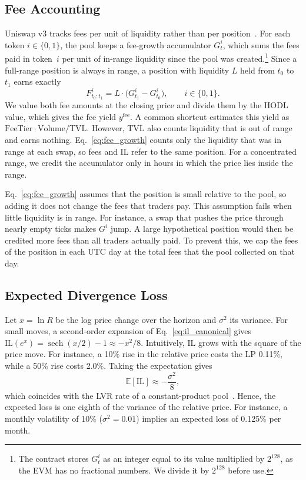 \documentclass[10pt,conference,compsocconf]{IEEEtran}
\begin{document}
\subsection{Fee Accounting}
\label{subsec:fee_accounting}
Uniswap v3 tracks fees per unit of liquidity rather than per position~\cite{uniswapv3}. For each token $i\in\{0,1\}$, the pool keeps a fee-growth accumulator $G^{i}_t$, which sums the fees paid in token~$i$ per unit of in-range liquidity since the pool was created.\footnote{The contract stores $G^{i}_t$ as an integer equal to its value multiplied by $2^{128}$, as the EVM has no fractional numbers. We divide it by $2^{128}$ before use.} Since a full-range position is always in range, a position with liquidity $L$ held from $t_0$ to $t_1$ earns exactly
\begin{equation}
\label{eq:fee_growth}
F^{i}_{t_0:t_1} = L\cdot\bigl(G^{i}_{t_1}-G^{i}_{t_0}\bigr), \qquad i\in\{0,1\}.
\end{equation}
We value both fee amounts at the closing price and divide them by the HODL value, which gives the fee yield $y^{\mathrm{fee}}$. A common shortcut estimates this yield as $\mathrm{FeeTier}\cdot\mathrm{Volume}/\mathrm{TVL}$. However, TVL also counts liquidity that is out of range and earns nothing. Eq.~\eqref{eq:fee_growth} counts only the liquidity that was in range at each swap, so fees and IL refer to the same position. For a concentrated range, we credit the accumulator only in hours in which the price lies inside the range.

Eq.~\eqref{eq:fee_growth} assumes that the position is small relative to the pool, so adding it does not change the fees that traders pay. This assumption fails when little liquidity is in range. For instance, a swap that pushes the price through nearly empty ticks makes $G^{i}$ jump. A large hypothetical position would then be credited more fees than all traders actually paid. To prevent this, we cap the fees of the position in each UTC day at the total fees that the pool collected on that day.

\subsection{Expected Divergence Loss}
\label{subsec:lvr}
Let $x=\ln R$ be the log price change over the horizon and $\sigma^2$ its variance. For small moves, a second-order expansion of Eq.~\eqref{eq:il_canonical} gives $\mathrm{IL}(e^{x}) = \operatorname{sech}(x/2)-1 \approx -x^2/8$. Intuitively, IL grows with the square of the price move. For instance, a 10\% rise in the relative price costs the LP 0.11\%, while a 50\% rise costs 2.0\%. Taking the expectation gives
\begin{equation}
\label{eq:lvr}
\mathbb{E}[\mathrm{IL}] \approx -\frac{\sigma^2}{8},
\end{equation}
which coincides with the LVR rate of a constant-product pool~\cite{milionis2022automated}. Hence, the expected loss is one eighth of the variance of the relative price. For instance, a monthly volatility of 10\% ($\sigma^2=0.01$) implies an expected loss of 0.125\% per month.
\end{document}
